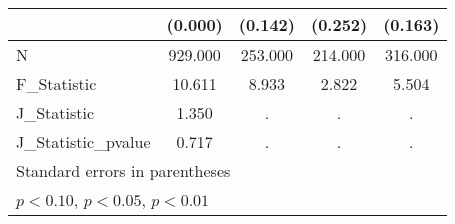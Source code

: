 {\begin{tabular}{l*{4}{c}}
            &     (0.000)         &     (0.142)         &     (0.252)         &     (0.163)         \\
\hline
N           &     929.000         &     253.000         &     214.000         &     316.000         \\
F\_Statistic &      10.611         &       8.933         &       2.822         &       5.504         \\
J\_Statistic &       1.350         &           .         &           .         &           .         \\
J\_Statistic\_pvalue&       0.717         &           .         &           .         &           .         \\
\hline\hline
\multicolumn{5}{l}{\footnotesize Standard errors in parentheses}\\
\multicolumn{5}{l}{\footnotesize \sym{*} \(p<0.10\), \sym{**} \(p<0.05\), \sym{***} \(p<0.01\)}\\
\end{tabular}
}
